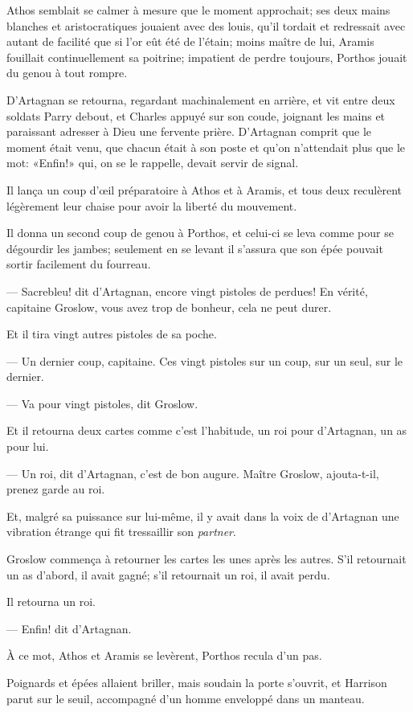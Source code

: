 Athos semblait se calmer à mesure que le moment approchait; ses deux mains blanches et aristocratiques jouaient avec des louis, qu'il tordait et redressait avec autant de facilité que si l'or eût été de l'étain; moins maître de lui, Aramis fouillait continuellement sa poitrine; impatient de perdre toujours, Porthos jouait du genou à tout rompre.

D'Artagnan se retourna, regardant machinalement en arrière, et vit entre deux soldats Parry debout, et Charles appuyé sur son coude, joignant les mains et paraissant adresser à Dieu une fervente prière. D'Artagnan comprit que le moment était venu, que chacun était à son poste et qu'on n'attendait plus que le mot: «Enfin!» qui, on se le rappelle, devait servir de signal.

Il lança un coup d'œil préparatoire à Athos et à Aramis, et tous deux reculèrent légèrement leur chaise pour avoir la liberté du mouvement.

Il donna un second coup de genou à Porthos, et celui-ci se leva comme pour se dégourdir les jambes; seulement en se levant il s'assura que son épée pouvait sortir facilement du fourreau.

— Sacrebleu! dit d'Artagnan, encore vingt pistoles de perdues! En vérité, capitaine Groslow, vous avez trop de bonheur, cela ne peut durer.

Et il tira vingt autres pistoles de sa poche.

— Un dernier coup, capitaine. Ces vingt pistoles sur un coup, sur un seul, sur le dernier.

— Va pour vingt pistoles, dit Groslow.

Et il retourna deux cartes comme c'est l'habitude, un roi pour d'Artagnan, un as pour lui.

— Un roi, dit d'Artagnan, c'est de bon augure. Maître Groslow, ajouta-t-il, prenez garde au roi.

Et, malgré sa puissance sur lui-même, il y avait dans la voix de d'Artagnan une vibration étrange qui fit tressaillir son \textit{partner}.

Groslow commença à retourner les cartes les unes après les autres. S'il retournait un as d'abord, il avait gagné; s'il retournait un roi, il avait perdu.

Il retourna un roi.

— Enfin! dit d'Artagnan.

À ce mot, Athos et Aramis se levèrent, Porthos recula d'un pas.

Poignards et épées allaient briller, mais soudain la porte s'ouvrit, et Harrison parut sur le seuil, accompagné d'un homme enveloppé dans un manteau.


